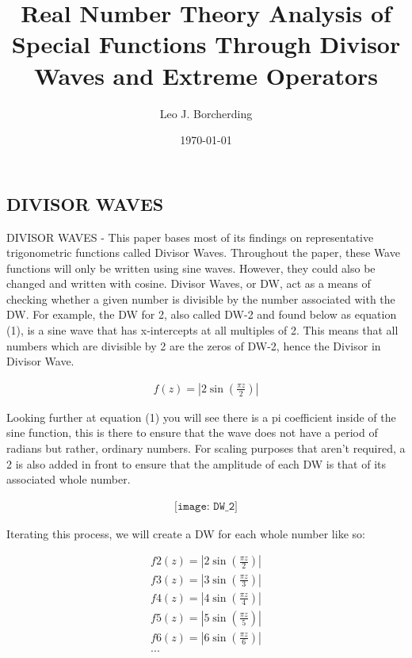 \documentclass{article}
\begin{document}
\title{Real Number Theory Analysis of Special Functions Through Divisor Waves and Extreme Operators}
\author{Leo J. Borcherding}
\date{\today}
\maketitle

\subsection*{DIVISOR WAVES}
DIVISOR WAVES - This paper bases most of its findings on representative trigonometric functions called Divisor Waves. Throughout the paper, these Wave functions will only be written using sine waves. However, they could also be changed and written with cosine.
Divisor Waves, or DW, act as a means of checking whether a given number is divisible by the number associated with the DW. For example, the DW for 2, also called DW-2 and found below as equation (1), is a sine wave that has x-intercepts at all multiples of 2. This means that all numbers which are divisible by 2 are the zeros of DW-2, hence the Divisor in Divisor Wave.

\begin{align*}
	f(z) = |2\sin\left(\frac{\pi z}{2}\right)|
\end{align*} 

Looking further at equation (1) you will see there is a pi coefficient inside of the sine function, this is there to ensure that the wave does not have a period of radians but rather, ordinary numbers. For scaling purposes that aren’t required, a 2 is also added in front to ensure that the amplitude of each DW is that of its associated whole number. 

\begin{align*}
\texttt{[image: DW\_2]}
\end{align*}

Iterating this process, we will create a DW for each whole number like so: 

\begin{align*}
	f2(z) = |2\sin\left(\frac{\pi z}{2}\right)| \\
	f3(z) = |3\sin\left(\frac{\pi z}{3}\right)| \\
	f4(z) = |4\sin\left(\frac{\pi z}{4}\right)|	\\
	f5(z) = |5\sin\left(\frac{\pi z}{5}\right)| \\
	f6(z) = |6\sin\left(\frac{\pi z}{6}\right)|	\\	
	...
\end{align*} 
\end{document}
